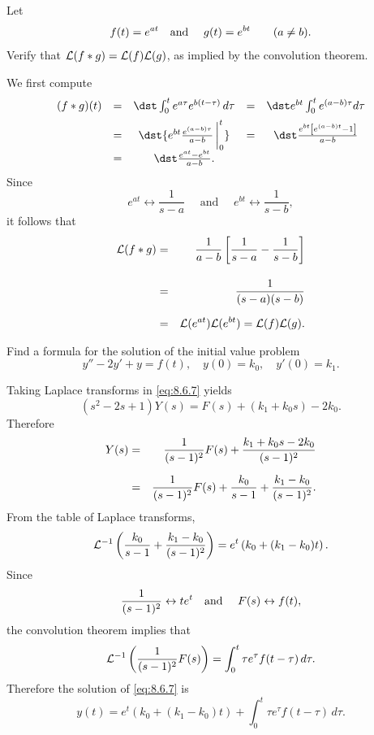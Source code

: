 \setcounter{example}{0}
\begin{example}
  \label{example:8.6.1}\rm Let
  \[
    f(t)=e^{at}\mbox{\quad and \quad}g(t)=e^{bt}\qquad(a\ne b).
  \]
  Verify that ${\cal L}(f\ast g)={\cal L}(f){\cal L}(g)$, as implied by the convolution theorem.
\end{example}
\begin{examplesolution}
\solution We first compute
\[
  \begin{array}{ccccc}
    (f\ast g)(t) & = & \dst\int_{0}^{t}e^{a\tau}e^{b(t-\tau)}\,d\tau         & = & \dst e^{bt}\int_{0}^{t}e^{(a-b)\tau}d\tau       \\[2\jot]
                 & = & \dst{e^{bt}\frac{e^{(a-b)\tau}}{a-b}\,\bigg|^{t}_{0}} & = & \dst\frac{e^{bt}\left[e^{(a-b)t}-1\right]}{a-b} \\[2\jot]
                 & = & \dst\frac{e^{at}-e^{bt}}{a-b}.
  \end{array}
\]
Since
\[
  e^{at}\leftrightarrow\frac{1}{s-a}\quad\mbox{ and }\quad e^{bt}\leftrightarrow\frac{1}{s-b},
\]
it follows that
\begin{eqnarray*}
  {\cal L}(f\ast g) & = & \frac{1}{a-b}\left[\frac{1}{s-a}-\frac{1}{s-b}\right] \\[10pt]
                    & = & \frac{1}{(s-a)(s-b)}                                  \\[2\jot]
                    & = & {\cal L}(e^{at}){\cal L}(e^{bt})={\cal L}(f){\cal L}(g).
\end{eqnarray*}
\end{examplesolution}

\setcounter{example}{1}
\setcounter{equation}{6}
\begin{example}
  \label{example:8.6.2}\rm Find a formula for the solution of the initial value problem
  \begin{equation}
    \label{eq:8.6.7}y''-2y'+y=f(t),\quad y(0)=k_{0},\quad y'(0)=k_{1}.
  \end{equation}
\end{example}
\begin{examplesolution}
\solution Taking Laplace transforms in \eqref{eq:8.6.7} yields
\[
  (s^{2}-2s+1)Y(s)=F(s)+(k_{1}+k_{0}s)-2k_{0}.
\]
Therefore
\begin{eqnarray*}
  Y(s) & = & \frac{1}{(s-1)^{2}}F(s)+\frac{k_{1}+k_{0}s-2k_{0}}{(s-1)^{2}} \\[2\jot]
       & = & \frac{1}{(s-1)^{2}}F(s)+\frac{k_{0}}{s-1}+\frac{k_{1}-k_{0}}{(s-1)^{2}}.
\end{eqnarray*}
From the table of Laplace transforms,
\[
  {\cal L}^{-1}\left(\frac{k_{0}}{s-1}+\frac{k_{1}-k_{0}}{(s-1)^{2}}\right) =e^{t}\left(k_{0}+(k_{1}-k_{0})t\right).
\]
Since
\[
  \frac{1}{(s-1)^{2}}\leftrightarrow te^{t}\mbox{\quad and \quad }F(s) \leftrightarrow f(t),
\]
the convolution theorem implies that
\[
  {\cal L}^{-1}\left(\frac{1}{(s-1)^{2}}F(s)\right)= \int_{0}^{t}\tau e^{\tau}f(t-\tau)\,d\tau.
\]
Therefore the solution of \eqref{eq:8.6.7} is
\[
  y(t)=e^{t}\left(k_{0}+(k_{1}-k_{0})t\right)+\int_{0}^{t}\tau e^{\tau}f(t-\tau)\, d\tau.
\]
\end{examplesolution}

